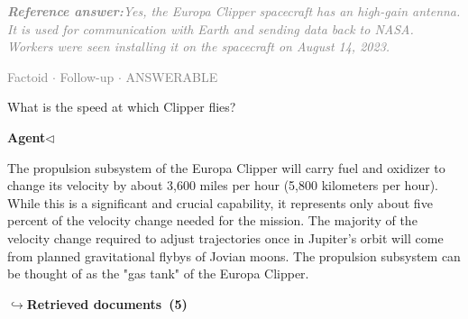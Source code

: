 \documentclass[a4paper,11pt]{article}
\begin{document}
\begin{refanswerenv}
{\footnotesize\textit{\textcolor{gray}{\textbf{Reference answer:}\enspace Yes, the Europa Clipper spacecraft has an high-gain antenna. It is used for communication with Earth and sending data back to NASA. Workers were seen installing it on the spacecraft on August 14, 2023.}}}
\end{refanswerenv}
\vspace{0.5em}
\hfill{\tiny\textcolor{gray}{Factoid $\cdot$ Follow-up $\cdot$ ANSWERABLE}}
\begin{userbubble}
What is the speed at which Clipper flies?
\end{userbubble}
\noindent\hfill{\small\textcolor{agentcolor}{\textbf{Agent\enspace$\triangleleft$}}}
\begin{agentbubble}
The propulsion subsystem of the Europa Clipper will carry fuel and oxidizer to change its velocity by about 3,600 miles per hour (5,800 kilometers per hour). While this is a significant and crucial capability, it represents only about five percent of the velocity change needed for the mission. The majority of the velocity change required to adjust trajectories once in Jupiter's orbit will come from planned gravitational flybys of Jovian moons. The propulsion subsystem can be thought of as the "gas tank" of the Europa Clipper.
\end{agentbubble}
\noindent\hfill{\footnotesize\textcolor{doccolor}{\textbf{$\hookrightarrow$\enspace Retrieved documents~(5)}}}
\end{document}
